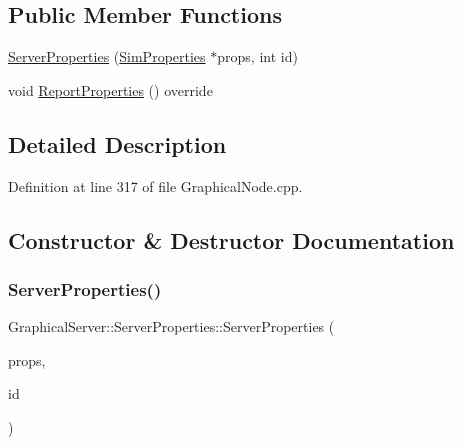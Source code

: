 \subsection*{Public Member Functions}
\begin{DoxyCompactItemize}
\item 
\hyperlink{class_graphical_server_1_1_server_properties_a36fc0d033c87955533983f3e4d62d44e}{Server\+Properties} (\hyperlink{class_graphical_node_1_1_sim_properties}{Sim\+Properties} $\ast$props, int id)
\item 
void \hyperlink{class_graphical_server_1_1_server_properties_a6bf00d11d4a62c51f661d5f915bdf8e0}{Report\+Properties} () override
\end{DoxyCompactItemize}


\subsection{Detailed Description}


Definition at line 317 of file Graphical\+Node.\+cpp.



\subsection{Constructor \& Destructor Documentation}
\mbox{\label{class_graphical_server_1_1_server_properties_a36fc0d033c87955533983f3e4d62d44e}} 
\subsubsection{\texorpdfstring{Server\+Properties()}{ServerProperties()}}
{\footnotesize\ttfamily Graphical\+Server\+::\+Server\+Properties\+::\+Server\+Properties (\begin{DoxyParamCaption}\item[{\hyperlink{class_graphical_node_1_1_sim_properties}{Sim\+Properties} $\ast$}]{props,  }\item[{int}]{id }\end{DoxyParamCaption})\hspace{0.3cm}{\ttfamily [inline]}}



